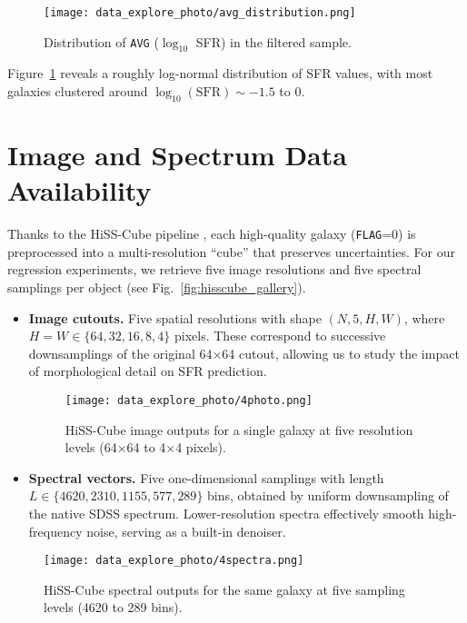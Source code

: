 \documentclass[english,bachelor,oneside]{ctufit-thesis}
\begin{document}
\begin{figure}[H]
  \centering
  \texttt{[image: data\_explore\_photo/avg\_distribution.png]}
  \caption{Distribution of \texttt{AVG} (\(\log_{10}\) SFR) in the filtered sample.}
  \label{fig:avg_distribution}
\end{figure}
\noindent
Figure~\ref{fig:avg_distribution} reveals a roughly log-normal distribution of SFR values, with most galaxies clustered around \(\log_{10}(\mathrm{SFR})\sim-1.5\) to 0.  

\section{Image and Spectrum Data Availability}  
Thanks to the HiSS-Cube pipeline \cite{nadvornik2021hiss}, each high-quality galaxy (\texttt{FLAG}=0) is preprocessed into a multi-resolution “cube” that preserves uncertainties. For our regression experiments, we retrieve five image resolutions and five spectral samplings per object (see Fig.~\ref{fig:hisscube_gallery}).



\begin{itemize}
  \item \textbf{Image cutouts.} Five spatial resolutions with shape $(N,5,H,W)$, where $H=W\in\{64,32,16,8,4\}$ pixels.  
    These correspond to successive downsamplings of the original 64×64 cutout, allowing us to study the impact of morphological detail on SFR prediction.
\begin{figure}[H]
  \centering
  \texttt{[image: data\_explore\_photo/4photo.png]}
  \caption{HiSS-Cube image outputs for a single galaxy at five resolution levels (64×64 to 4×4 pixels).}
  \label{fig:hisscube_images}
\end{figure}
  \item \textbf{Spectral vectors.} Five one-dimensional samplings with length 
  $L\in\{4620,2310,1155,577,289\}$ bins,  
    obtained by uniform downsampling of the native SDSS spectrum. Lower-resolution spectra effectively smooth high-frequency noise, serving as a built-in denoiser.
\end{itemize}

\begin{figure}[H]
  \centering
  \texttt{[image: data\_explore\_photo/4spectra.png]}
  \caption{HiSS-Cube spectral outputs for the same galaxy at five sampling levels (4620 to 289 bins).}
  \label{fig:hisscube_spectra}
\end{figure}
\end{document}
